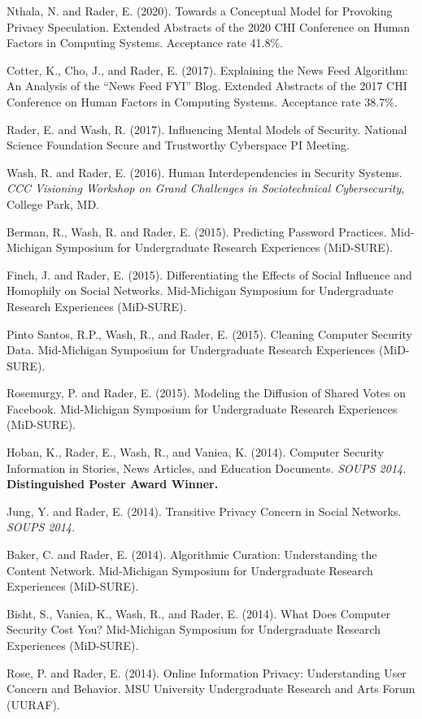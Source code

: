 \documentclass[9pt]{extarticle}
\begin{document}
Nthala, N. and Rader, E. (2020). Towards a Conceptual Model for Provoking Privacy Speculation. Extended Abstracts of the 2020 CHI Conference on Human Factors in Computing Systems. Acceptance rate 41.8\%.

Cotter, K., Cho, J., and Rader, E. (2017). Explaining the News Feed Algorithm: An Analysis of the ``News Feed FYI'' Blog. Extended Abstracts of the 2017 CHI Conference on Human Factors in Computing Systems. Acceptance rate 38.7\%.

Rader, E. and Wash, R. (2017). Influencing Mental Models of Security. National Science Foundation Secure and Trustworthy Cyberspace PI Meeting.

Wash, R. and Rader, E. (2016). Human Interdependencies in Security Systems. \emph{CCC Visioning Workshop on Grand Challenges in Sociotechnical Cybersecurity}, College Park, MD.

Berman, R., Wash, R. and Rader, E. (2015). Predicting Password Practices. Mid-Michigan Symposium for Undergraduate Research Experiences (MiD-SURE).

Finch, J. and Rader, E. (2015). Differentiating the Effects of Social Influence and Homophily on Social Networks. Mid-Michigan Symposium for Undergraduate Research Experiences (MiD-SURE).

Pinto Santos, R.P., Wash, R., and Rader, E. (2015). Cleaning Computer Security Data. Mid-Michigan Symposium for Undergraduate Research Experiences (MiD-SURE).

Rosemurgy, P. and Rader, E. (2015). Modeling the Diffusion of Shared Votes on Facebook. Mid-Michigan Symposium for Undergraduate Research Experiences (MiD-SURE).

Hoban, K., Rader, E., Wash, R., and Vaniea, K. (2014). Computer Security Information in Stories, News Articles, and Education Documents. \emph{SOUPS 2014.} \textbf{Distinguished Poster Award Winner.}

Jung, Y. and Rader, E. (2014). Transitive Privacy Concern in Social Networks. \emph{SOUPS 2014.}

Baker, C. and Rader, E. (2014). Algorithmic Curation: Understanding the Content Network. Mid-Michigan Symposium for Undergraduate Research Experiences (MiD-SURE).

Bisht, S., Vaniea, K., Wash, R., and Rader, E. (2014). What Does Computer Security Cost You? Mid-Michigan Symposium for Undergraduate Research Experiences (MiD-SURE).

Rose, P. and Rader, E. (2014). Online Information Privacy: Understanding User Concern and Behavior. MSU University Undergraduate Research and Arts Forum (UURAF).
\end{document}
